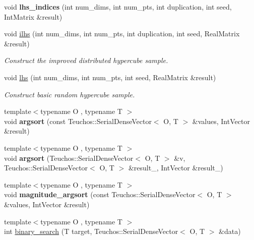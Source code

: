 \begin{DoxyCompactItemize}
\item 
void {\bfseries lhs\+\_\+indices} (int num\+\_\+dims, int num\+\_\+pts, int duplication, int seed, Int\+Matrix \&result)\label{MathTools_8hpp_a7d4af51c9ce21b69723c17d310c9b3d5}

\item 
void \hyperlink{MathTools_8hpp_a281b3cc477a9f7cb2f8a0521b136f47f}{ilhs} (int num\+\_\+dims, int num\+\_\+pts, int duplication, int seed, Real\+Matrix \&result)\label{MathTools_8hpp_a281b3cc477a9f7cb2f8a0521b136f47f}

\begin{DoxyCompactList}\small\item\em Construct the improved distributed hypercube sample. \end{DoxyCompactList}\item 
void \hyperlink{MathTools_8hpp_ad630759c81fad6ef75633fac88b064ad}{lhs} (int num\+\_\+dims, int num\+\_\+pts, int seed, Real\+Matrix \&result)\label{MathTools_8hpp_ad630759c81fad6ef75633fac88b064ad}

\begin{DoxyCompactList}\small\item\em Construct basic random hypercube sample. \end{DoxyCompactList}\item 
{\footnotesize template$<$typename O , typename T $>$ }\\void {\bfseries argsort} (const Teuchos\+::\+Serial\+Dense\+Vector$<$ O, T $>$ \&values, Int\+Vector \&result)\label{MathTools_8hpp_a61ee7b3724dafed39e286d2561ef0f12}

\item 
{\footnotesize template$<$typename O , typename T $>$ }\\void {\bfseries argsort} (Teuchos\+::\+Serial\+Dense\+Vector$<$ O, T $>$ \&v, Teuchos\+::\+Serial\+Dense\+Vector$<$ O, T $>$ \&result\+\_, Int\+Vector \&result\+\_)\label{MathTools_8hpp_aa7a2b4ea5bcce643f20c95cf204c204f}

\item 
{\footnotesize template$<$typename O , typename T $>$ }\\void {\bfseries magnitude\+\_\+argsort} (const Teuchos\+::\+Serial\+Dense\+Vector$<$ O, T $>$ \&values, Int\+Vector \&result)\label{MathTools_8hpp_a2fcd2e5fbcd1cfe118cc2b9011095284}

\item 
{\footnotesize template$<$typename O , typename T $>$ }\\int \hyperlink{MathTools_8hpp_a5b7825c8b05353d9d19f4f9afff064d6}{binary\+\_\+search} (T target, Teuchos\+::\+Serial\+Dense\+Vector$<$ O, T $>$ \&data)\label{MathTools_8hpp_a5b7825c8b05353d9d19f4f9afff064d6}


\end{DoxyCompactItemize}
